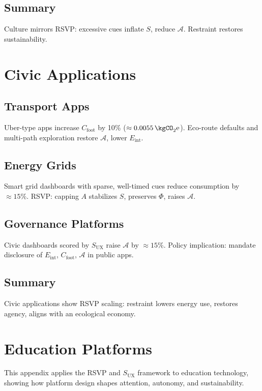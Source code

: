 \documentclass[openany]{book}
\newcommand{\Eint}{E_{\mathrm{int}}} %
\newcommand{\Cfoot}{C_{\mathrm{foot}}} %
\newcommand{\Auton}{\mathcal{A}} %
\newcommand{\SUX}{S_{\mathrm{UX}}} %
\begin{document}
\section{Summary}
Culture mirrors RSVP: excessive cues inflate $S$, reduce $\Auton$. Restraint restores sustainability.

\chapter{Civic Applications}
\label{app:civic}

\section{Transport Apps}
Uber-type apps increase $\Cfoot$ by 10\% ($\approx \SI{0.0055}{\kgCO_2\text{e}}$).  
Eco-route defaults and multi-path exploration restore $\Auton$, lower $\Eint$.

\section{Energy Grids}
Smart grid dashboards with sparse, well-timed cues reduce consumption by $\approx 15\%$.  
RSVP: capping $A$ stabilizes $S$, preserves $\Phi$, raises $\Auton$.

\section{Governance Platforms}
Civic dashboards scored by $\SUX$ raise $\Auton$ by $\approx 15\%$.  
Policy implication: mandate disclosure of $\Eint$, $\Cfoot$, $\Auton$ in public apps.

\section{Summary}
Civic applications show RSVP scaling: restraint lowers energy use, restores agency, aligns with an ecological economy.

\chapter{Education Platforms}
\label{app:education}

This appendix applies the RSVP and $\SUX$ framework to education technology, showing how platform design shapes attention, autonomy, and sustainability.
\end{document}
